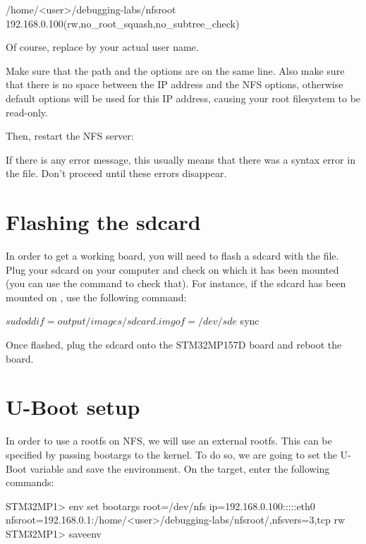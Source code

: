 \scriptsize
\begin{bashinput}
/home/<user>/debugging-labs/nfsroot 192.168.0.100(rw,no_root_squash,no_subtree_check)
\end{bashinput}
\normalsize

Of course, replace  by your actual user name.

Make sure that the path and the options are on the same line.
Also make sure that there is no space between the IP address and the NFS
options, otherwise default options will be used for this IP address,
causing your root filesystem to be read-only.

Then, restart the NFS server:


If there is any error message, this usually means that there was a
syntax error in the  file. Don't proceed until these
errors disappear.

\section{Flashing the sdcard}

In order to get a working board, you will need to flash a sdcard with the 
 file. Plug your sdcard on your computer and
check on which  it has been mounted (you can use the 
command to check that). For instance, if the sdcard has been mounted on
, use the following command:

\begin{bashinput}
$ sudo dd if=output/images/sdcard.img of=/dev/sde
$ sync
\end{bashinput}

Once flashed, plug the sdcard onto the STM32MP157D board and reboot the board.

\section{U-Boot setup}

In order to use a rootfs on NFS, we will use an external rootfs. This can be
specified by passing bootargs to the kernel. To do so, we are going to set the
 U-Boot variable and save the environment. On the target, enter
the following commands:

\begin{bashinput}
STM32MP1> env set bootargs root=/dev/nfs ip=192.168.0.100:::::eth0
  nfsroot=192.168.0.1:/home/<user>/debugging-labs/nfsroot/,nfsvers=3,tcp rw
STM32MP1> saveenv
\end{bashinput}

